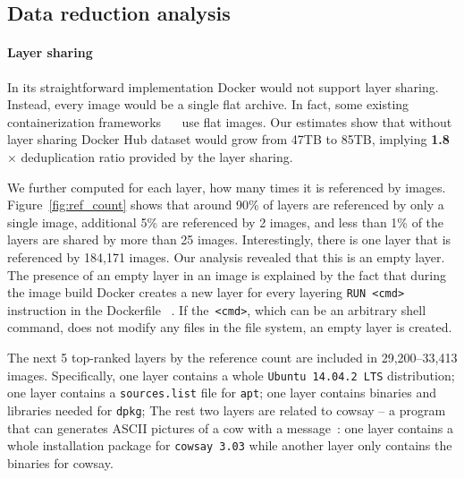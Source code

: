 \subsection{Data reduction analysis} 
\label{sec:dedup_ratio}

\paragraph{Layer sharing}

In its  straightforward implementation Docker would not support layer sharing.
%
Instead, every image would be a single flat archive.
%
In fact, some existing containerization frameworks
~\cite{singularity}~\cite{openvz} 
%
use flat images.
%
Our estimates show that without layer sharing Docker Hub dataset would grow
from 47TB to 85TB, implying \textbf{1.8$\times$} deduplication ratio provided
by the layer sharing.
 
We further computed for each layer, how many times it is referenced by images.
%
Figure~\ref{fig:ref_count} shows that around 90\% of layers are referenced by
only a single image, additional 5\% are referenced by 2 images, and less than
1\% of the layers are shared by more than 25 images.
%
Interestingly, there is one layer that is referenced by 184,171 images.  Our
analysis revealed that this is an empty layer.
%
The presence of an empty layer in an image is explained
by the fact that during the image build Docker creates a new layer
for every layering \texttt{RUN <cmd>} instruction
in the Dockerfile~
.
%
If the~\texttt{<cmd>}, which can be an arbitrary shell command,
does not modify any files in the file system,
an empty layer is created.
%

The next 5 top-ranked layers by the reference count
are included in 29,200--33,413 images.
Specifically, one layer contains a whole \texttt{Ubuntu 14.04.2 LTS} distribution; 
one layer contains a \texttt{sources.list} file for \texttt{apt};
one layer contains binaries and libraries needed for \texttt{dpkg};
The rest two layers are related to cowsay -- a program that can generates ASCII pictures of a cow with a message~\cite{cowsay}:
one layer contains a whole installation package for \texttt{cowsay 3.03} 
while another layer only contains the binaries for cowsay.
 
